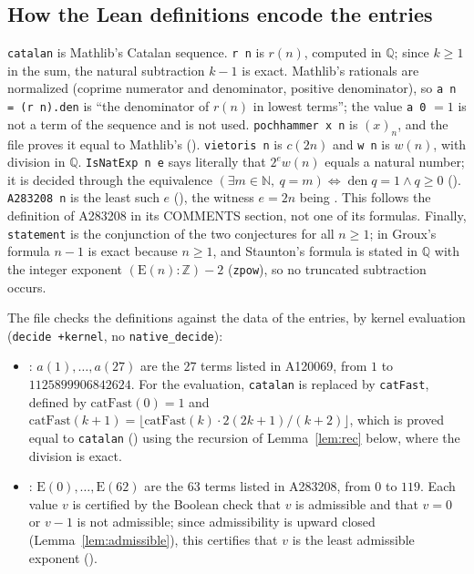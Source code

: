 \documentclass[11pt]{amsart}
\theoremstyle{plain}
\theoremstyle{definition}
\newcommand{\code}[1]{\texttt{#1}}
\newcommand{\N}{\mathbb{N}}
\newcommand{\Z}{\mathbb{Z}}
\newcommand{\Q}{\mathbb{Q}}
\DeclareMathOperator{\den}{den}
\newcommand{\E}{\mathrm{E}}
\begin{document}
\subsection*{How the Lean definitions encode the entries}
\code{catalan} is Mathlib's Catalan sequence. \code{r n} is $r(n)$, computed in $\Q$; since $k\ge1$ in the sum, the natural subtraction $k-1$ is exact. Mathlib's rationals are normalized (coprime numerator and denominator, positive denominator), so \code{a n = (r n).den} is ``the denominator of $r(n)$ in lowest terms''; the value \code{a 0} $=1$ is not a term of the sequence and is not used. \code{pochhammer x n} is $(x)_n$, and the file proves it equal to Mathlib's  (). \code{vietoris n} is $c(2n)$ and \code{w n} is $w(n)$, with division in $\Q$. \code{IsNatExp n e} says literally that $2^e w(n)$ equals a natural number; it is decided through the equivalence $(\exists m\in\N,\ q=m)\iff \den q=1\wedge q\ge0$ (). \code{A283208 n} is the least such $e$ (), the witness $e=2n$ being . This follows the definition of A283208 in its COMMENTS section, not one of its formulas. Finally, \code{statement} is the conjunction of the two conjectures for all $n\ge1$; in Groux's formula $n-1$ is exact because $n\ge1$, and Staunton's formula is stated in $\Q$ with the integer exponent $(\E(n):\Z)-2$ (\code{zpow}), so no truncated subtraction occurs.

The file checks the definitions against the data of the entries, by kernel evaluation (\texttt{decide +kernel}, no \texttt{native\_decide}):
\begin{itemize}
\item {}: $a(1),\dots,a(27)$ are the $27$ terms listed in A120069, from $1$ to $1125899906842624$. For the evaluation, \code{catalan} is replaced by \code{catFast}, defined by $\mathrm{catFast}(0)=1$ and $\mathrm{catFast}(k+1)=\lfloor \mathrm{catFast}(k)\cdot2(2k+1)/(k+2)\rfloor$, which is proved equal to \code{catalan} () using the recursion of Lemma~\ref{lem:rec} below, where the division is exact.
\item {}: $\E(0),\dots,\E(62)$ are the $63$ terms listed in A283208, from $0$ to $119$. Each value $v$ is certified by the Boolean check that $v$ is admissible and that $v=0$ or $v-1$ is not admissible; since admissibility is upward closed (Lemma~\ref{lem:admissible}), this certifies that $v$ is the least admissible exponent ().
\end{itemize}
\end{document}
